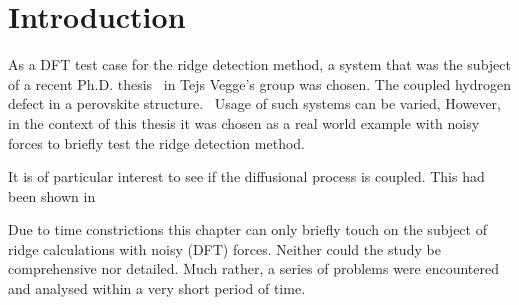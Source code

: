 \section{Introduction}
\label{sec:perovskites-introduction}

As a DFT test case for the ridge detection method, a system that was the subject of a recent Ph.D. thesis~\cite{nicolai-2010} in Tejs Vegge's group was chosen.
The coupled hydrogen defect in a  perovskite structure.~\cite{double-defect-2011}
Usage of such systems can be varied, \expand
However, in the context of this thesis it was chosen as a real world example with noisy forces to briefly test the ridge detection method.

It is of particular interest to see if the diffusional process is coupled.
This had been shown in \cite{double-defect-2011} \expand

Due to time constrictions this chapter can only briefly touch on the subject of ridge calculations with noisy (DFT) forces.
Neither could the study be comprehensive nor detailed.
Much rather, a series of problems were encountered and analysed within a very short period of time.
\expand


